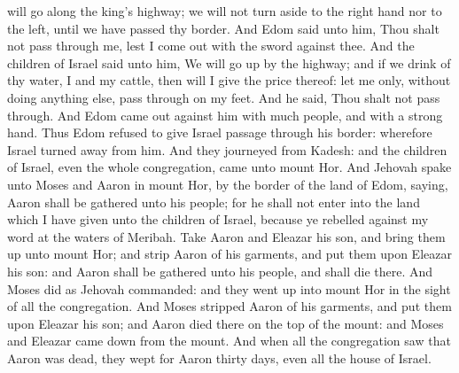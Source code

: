 will go along the king’s highway; we will not turn aside to the right hand nor to the left, until we have passed thy border. And Edom said unto him, Thou shalt not pass through me, lest I come out with the sword against thee. And the children of Israel said unto him, We will go up by the highway; and if we drink of thy water, I and my cattle, then will I give the price thereof: let me only, without doing anything else, pass through on my feet. And he said, Thou shalt not pass through. And Edom came out against him with much people, and with a strong hand. Thus Edom refused to give Israel passage through his border: wherefore Israel turned away from him.  And they journeyed from Kadesh: and the children of Israel, even the whole congregation, came unto mount Hor. And Jehovah spake unto Moses and Aaron in mount Hor, by the border of the land of Edom, saying, Aaron shall be gathered unto his people; for he shall not enter into the land which I have given unto the children of Israel, because ye rebelled against my word at the waters of Meribah. Take Aaron and Eleazar his son, and bring them up unto mount Hor; and strip Aaron of his garments, and put them upon Eleazar his son: and Aaron shall be gathered unto his people, and shall die there. And Moses did as Jehovah commanded: and they went up into mount Hor in the sight of all the congregation. And Moses stripped Aaron of his garments, and put them upon Eleazar his son; and Aaron died there on the top of the mount: and Moses and Eleazar came down from the mount. And when all the congregation saw that Aaron was dead, they wept for Aaron thirty days, even all the house of Israel. 

